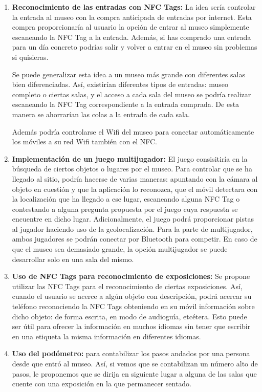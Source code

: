 \documentclass{article}
\begin{document}
\begin{enumerate}
	\item \textbf{Reconocimiento de las entradas con NFC Tags:} La idea sería controlar la entrada al museo con la compra anticipada de entradas por internet. Esta compra proporcionaría al usuario la opción de entrar al museo simplemente escaneando la NFC Tag a la entrada. Además, si has comprado una entrada para un día concreto podrías salir y volver a entrar en el museo sin problemas si quisieras. 
	
	Se puede generalizar esta idea a un museo más grande con diferentes salas bien diferenciadas. Así, existirían diferentes tipos de entradas: museo completo o ciertas salas, y el acceso a cada sala del museo se podría realizar escaneando la NFC Tag correspondiente a la entrada comprada. De esta manera se ahorrarían las colas a la entrada de cada sala.
	
	Además podría controlarse el Wifi del museo para conectar automáticamente los móviles a su red Wifi también con el NFC.

	\item \textbf{Implementación de un juego multijugador:} El juego consisitiría en la búsqueda de ciertos objetos o lugares por el museo. Para controlar que se ha llegado al sitio, podría hacerse de varias maneras: apuntando con la cámara al objeto en cuestión y que la aplicación lo reconozca, que el móvil detectara con la localización que ha llegado a ese lugar, escaneando alguna NFC Tag o contestando a alguna pregunta propuesta por el juego cuya respuesta se encuentre en dicho lugar. Adicionalmente, el juego podrá proporcionar pistas al jugador haciendo uso de la geolocalización. Para la parte de multijugador, ambos jugadores se podrán conectar por Bluetooth para competir. En caso de que el museo sea demasiado grande, la opción multijugador se puede desarrollar solo en una sala del mismo.

	\item \textbf{Uso de NFC Tags para reconocimiento de exposiciones:} Se propone utilizar las NFC Tags para el reconocimiento de ciertas exposiciones. Así, cuando el usuario se acerce a algún objeto con descripción, podrá acercar su teléfono reconociendo la NFC Tags obteniendo en su móvil información sobre dicho objeto: de forma escrita, en modo de audioguía, etcétera. Esto puede ser útil para ofrecer la información en muchos idiomas sin tener que escribir en una etiqueta la misma información en diferentes idiomas. 

	\item \textbf{Uso del podómetro:} para contabilizar los pasos andados por una persona desde que entró al museo. Así, si vemos que se contabilizan un número alto de pasos, le proponemos que se dirija en siguiente lugar a alguna de las salas que cuente con una exposición en la que permanecer sentado.


\end{enumerate}
\end{document}
